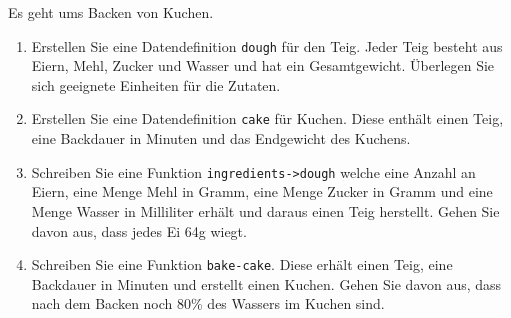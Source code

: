 \begin{aufgabe}

  Es geht ums Backen von Kuchen.

  \begin{enumerate}
  \item Erstellen Sie eine Datendefinition
    \texttt{dough} für den Teig.  Jeder Teig besteht aus Eiern, Mehl,
    Zucker und Wasser und hat ein Gesamtgewicht.  Überlegen Sie sich
    geeignete Einheiten für die Zutaten.
  \item Erstellen Sie eine Datendefinition \texttt{cake}
    für Kuchen.  Diese enthält einen Teig, eine Backdauer in Minuten und 
    das Endgewicht des Kuchens.
  \item Schreiben Sie eine Funktion
    \texttt{ingredients->dough} welche eine Anzahl an Eiern, eine
    Menge Mehl in Gramm, eine Menge Zucker in Gramm und eine
    Menge Wasser in Milliliter erhält und daraus einen Teig
    herstellt. Gehen Sie davon aus, dass jedes Ei 64g wiegt.
  \item Schreiben Sie eine Funktion \texttt{bake-cake}. 
    Diese erhält einen Teig, eine Backdauer in Minuten und erstellt einen 
    Kuchen.  Gehen Sie davon aus, dass nach dem Backen noch 80\% des
    Wassers im Kuchen sind.
  \end{enumerate}
  
\end{aufgabe}


